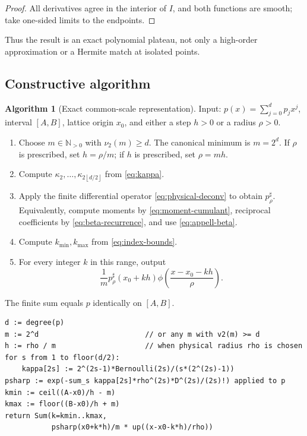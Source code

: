 \documentclass[11pt,oneside]{article}
\theoremstyle{definition}
\newtheorem{algorithm}[theorem]{Algorithm}
\theoremstyle{remark}
\newcommand{\N}{\mathbb N}
\newcommand{\vtwo}{\nu_2}
\newcommand{\floor}[1]{\left\lfloor #1\right\rfloor}
\begin{document}
\begin{proof}
All derivatives agree in the interior of \(I\), and both functions are smooth;
take one-sided limits to the endpoints.
\end{proof}

Thus the result is an exact polynomial plateau, not only a high-order
approximation or a Hermite match at isolated points.

\subsection{Constructive algorithm}

\begin{algorithm}[Exact common-scale representation]
\label{alg:main}
Input: \(p(x)=\sum_{j=0}^{d}p_jx^j\), interval \([A,B]\), lattice origin
\(x_0\), and either a step \(h>0\) or a radius \(\rho>0\).
\begin{enumerate}
  \item Choose \(m\in\N_{>0}\) with \(\vtwo(m)\ge d\).  The canonical minimum
        is \(m=2^d\).  If \(\rho\) is prescribed, set \(h=\rho/m\); if \(h\)
        is prescribed, set \(\rho=mh\).
  \item Compute \(\kappa_2,\ldots,\kappa_{2\floor{d/2}}\) from
        \eqref{eq:kappa}.
  \item Apply the finite differential operator \eqref{eq:physical-deconv} to
        obtain \(p_\rho^\sharp\).  Equivalently, compute moments by
        \eqref{eq:moment-cumulant}, reciprocal coefficients by
        \eqref{eq:beta-recurrence}, and use \eqref{eq:appell-beta}.
  \item Compute \(k_{\min},k_{\max}\) from \eqref{eq:index-bounds}.
  \item For every integer \(k\) in this range, output
        \[
          \frac1m p_\rho^\sharp(x_0+kh)
          \phi\!\left(\frac{x-x_0-kh}{\rho}\right).
        \]
\end{enumerate}
The finite sum equals \(p\) identically on \([A,B]\).
\end{algorithm}

\begin{lstlisting}[style=pseudo,caption={Compressed pseudocode for the exact construction.}]
d := degree(p)
m := 2^d                         // or any m with v2(m) >= d
h := rho / m                     // when physical radius rho is chosen
for s from 1 to floor(d/2):
    kappa[2s] := 2^(2s-1)*Bernoulli(2s)/(s*(2^(2s)-1))
psharp := exp(-sum_s kappa[2s]*rho^(2s)*D^(2s)/(2s)!) applied to p
kmin := ceil((A-x0)/h - m)
kmax := floor((B-x0)/h + m)
return Sum(k=kmin..kmax,
           psharp(x0+k*h)/m * up((x-x0-k*h)/rho))
\end{lstlisting}
\end{document}
